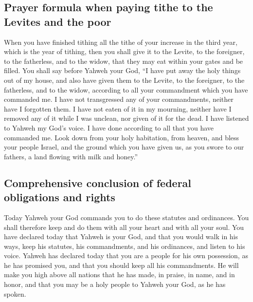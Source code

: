 \hypertarget{prayer-formula-when-paying-tithe-to-the-levites-and-the-poor}{%
\subsection{Prayer formula when paying tithe to the Levites and the
poor}\label{prayer-formula-when-paying-tithe-to-the-levites-and-the-poor}}

 When you have finished tithing all the tithe of your
increase in the third year, which is the year of tithing, then you shall
give it to the Levite, to the foreigner, to the fatherless, and to the
widow, that they may eat within your gates and be filled.
 You shall say before Yahweh your God, ``I have put away
the holy things out of my house, and also have given them to the Levite,
to the foreigner, to the fatherless, and to the widow, according to all
your commandment which you have commanded me. I have not transgressed
any of your commandments, neither have I forgotten them. 
I have not eaten of it in my mourning, neither have I removed any of it
while I was unclean, nor given of it for the dead. I have listened to
Yahweh my God's voice. I have done according to all that you have
commanded me.  Look down from your holy habitation, from
heaven, and bless your people Israel, and the ground which you have
given us, as you swore to our fathers, a land flowing with milk and
honey.''

\hypertarget{comprehensive-conclusion-of-federal-obligations-and-rights}{%
\subsection{Comprehensive conclusion of federal obligations and
rights}\label{comprehensive-conclusion-of-federal-obligations-and-rights}}

 Today Yahweh your God commands you to do these statutes
and ordinances. You shall therefore keep and do them with all your heart
and with all your soul.  You have declared today that
Yahweh is your God, and that you would walk in his ways, keep his
statutes, his commandments, and his ordinances, and listen to his voice.
 Yahweh has declared today that you are a people for his
own possession, as he has promised you, and that you should keep all his
commandments.  He will make you high above all nations
that he has made, in praise, in name, and in honor, and that you may be
a holy people to Yahweh your God, as he has spoken.

